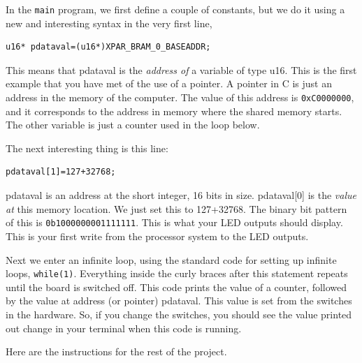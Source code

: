 \documentclass[../physical_computing.tex]{subfiles}
\begin{document}
In the \texttt{main} program, we first define a couple of constants, but we do it using a new and interesting syntax in the very first line,

\begin{verbatim}
u16* pdataval=(u16*)XPAR_BRAM_0_BASEADDR;
\end{verbatim}

This means that pdataval is the {\it address of} a variable of type u16. This is the first example that you have met of the use of a pointer. A pointer in C is just an address in the memory of the computer. The value of this address is \texttt{0xC0000000}, and it corresponds to the address in memory where the shared memory starts. The other variable is just a counter used in the loop below.

The next interesting thing is this line:

\begin{verbatim}
pdataval[1]=127+32768;
\end{verbatim}

pdataval is an address at the short integer, 16 bits in size. pdataval[0] is the {\it value at} this memory location. We just set this to 127+32768. The binary bit pattern of this is
\texttt{0b1000000001111111}. This is what your LED outputs should display. This is your first write from the processor system to the LED outputs. 

Next we enter an infinite loop, using the standard code for setting up infinite loops, 
\texttt{while(1)}. Everything inside the curly braces after this statement repeats until the board is switched off. This code prints the value of a counter, followed by the value at address (or pointer) pdataval. This value is set from the switches in the hardware. So, if you change the switches, you should see the value printed out change in your terminal when this code is running.

Here are the instructions for the rest of the project.
\end{document}
